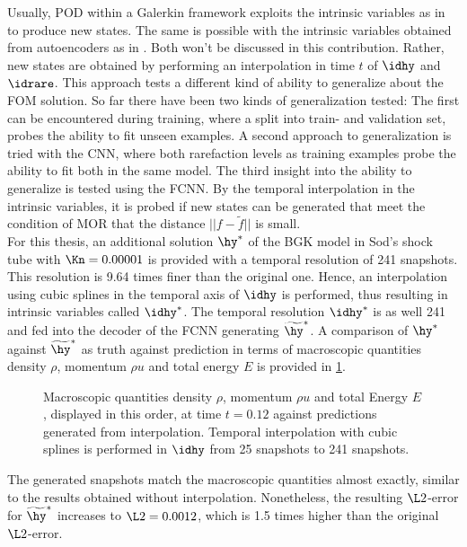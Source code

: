 Usually, POD within a Galerkin framework exploits the intrinsic variables as in \cite{Bernard} to produce new states. The same is possible with the intrinsic variables obtained from autoencoders as in \cite{Carlberg}. Both won't be discussed in this contribution. Rather, new states are obtained by performing an interpolation in time \(t\) of \(\idhy\) and \(\idrare\). This approach tests a different kind of ability to generalize about the FOM solution. So far there have been two kinds of generalization tested: The first can be encountered during training, where a split into train- and validation set, probes the ability to fit unseen examples. A second approach to generalization is tried with the CNN, where both rarefaction levels as training examples probe the ability to fit both in the same model. The third insight into the ability to generalize is tested using the FCNN. By the temporal interpolation in the intrinsic variables, it is probed if new states can be generated that meet the condition of MOR that the distance \(||f - \tilde{f}||\) is small.\\
For this thesis, an additional solution \(\hy^*\) of the BGK model in Sod's shock tube with \(\Kn=0.00001\) is provided with a temporal resolution of 241 snapshots. This resolution is 9.64 times finer than the original one. Hence, an interpolation using cubic splines in the temporal axis of \(\idhy\) is performed, thus resulting in intrinsic variables called \(\idhy^*\). The temporal resolution \(\idhy^*\) is as well 241  and fed into the decoder of the FCNN generating \(\widetilde{\hy}^*\). A comparison of \(\hy^*\) against \(\widetilde{\hy}^*\) as truth against prediction in terms of macroscopic quantities density \(\rho\), momentum \(\rho u\) and total energy \(E\) is provided in \cref{Fig: IntHy}.
\begin{figure}[H]
	
	\caption{Macroscopic quantities density \(\rho\), momentum \(\rho u\) and total Energy \(E\), displayed in this order, at time \(t=0.12\) against predictions generated from interpolation. Temporal interpolation with cubic splines is performed in \(\idhy\) from 25 snapshots to 241 snapshots.}
	\label{Fig: IntHy}
\end{figure}
The generated snapshots match the macroscopic quantities almost exactly, similar to the results obtained without interpolation. Nonetheless, the resulting \(\L2\)-error for \(\widetilde{\hy}^*\) increases to \(\L2=0.0012\), which is 1.5 times higher than the original \(\L2\)-error.\\

